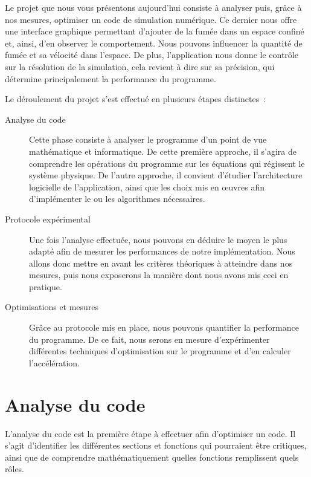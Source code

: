 \documentclass[12pt,a4paper]{article}
\begin{document}
Le projet que nous vous présentons aujourd’hui consiste à analyser puis,
grâce à nos mesures, optimiser un code de simulation numérique. Ce dernier
nous offre une interface graphique permettant d’ajouter de la fumée dans un
espace confiné et, ainsi, d’en observer le comportement. Nous pouvons
influencer la quantité de fumée et sa vélocité dans l’espace. De plus,
l’application nous donne le contrôle sur la résolution de la simulation,
cela revient à dire sur sa précision, qui détermine principalement la
performance du programme.

Le déroulement du projet s’est effectué en plusieurs étapes distinctes :
\begin{description}
    \item[Analyse du code] Cette phase consiste à analyser le programme
        d’un point de vue mathématique et informatique. De cette première
        approche, il s’agira de comprendre les opérations du programme sur
        les équations qui régissent le système physique. De l’autre
        approche, il convient d’étudier l’architecture logicielle de
        l’application, ainsi que les choix mis en œuvres afin d’implémenter
        le ou les algorithmes nécessaires.
    \item[Protocole expérimental] Une fois l’analyse effectuée, nous
        pouvons en déduire le moyen le plus adapté afin de mesurer les
        performances de notre implémentation. Nous allons donc mettre en
        avant les critères théoriques à atteindre dans nos mesures, puis
        nous exposerons la manière dont nous avons mis ceci en pratique.
    \item[Optimisations et mesures] Grâce au protocole mis en place, nous
        pouvons quantifier la performance du programme. De ce fait, nous serons
        en mesure d’expérimenter différentes techniques d’optimisation sur le
        programme et d’en calculer l’accélération.
\end{description}

\section{Analyse du code}
\label{sec.analyze}


L'analyse du code est la première étape à effectuer afin d'optimiser un code. Il
s'agit d'identifier les différentes sections et fonctions qui pourraient être
critiques, ainsi que de comprendre mathématiquement quelles fonctions
remplissent quels rôles.
\end{document}
